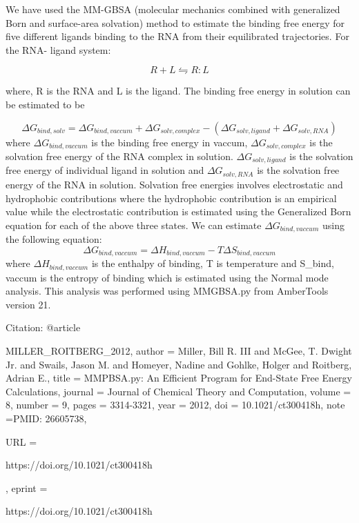 We have used the MM-GBSA (molecular mechanics combined with generalized Born and surface-area solvation) method to 
estimate the binding free energy for five different ligands binding to the RNA from their equilibrated trajectories. For the RNA-
ligand system:

\begin{equation} \label{eq:MMGBSA_reaction}
R + L \leftrightharpoons R:L
\end{equation}

where, R is the RNA and L is the ligand.
The binding free energy in solution can be estimated to be 

\begin{equation} \label{eq:MMGBSA_delG_equation}
\Delta G_{bind, solv} = \Delta G_{bind, vaccum} + \Delta G_{solv, complex} -(\Delta G_{solv, ligand} + \Delta G_{solv, RNA})
\end{equation}
where $\Delta G_{bind, vaccum} $ is the binding free energy in vaccum, $\Delta G_{solv, complex}$ is the solvation free energy of 
the RNA complex in solution.
$\Delta G_{solv, ligand}$ is the solvation free energy of individual ligand in solution and $\Delta G_{solv, RNA}$ is the solvation free energy of the RNA in solution.
Solvation free energies involves electrostatic and hydrophobic contributions where the hydrophobic contribution is an empirical value while the electrostatic contribution is estimated using the 
Generalized Born equation for each of the above three states.
We can estimate $\Delta G_{bind, vaccum} $ using the following equation:
\begin{equation} \label{}
 \Delta G_{bind, vaccum} = \Delta H_{bind, vaccum} - T \Delta S_{bind, vaccum}
\end{equation}
where $\Delta H_{bind, vaccum}$ is the enthalpy of binding, T is temperature and \Delta S_{bind, vaccum} is the entropy of binding which is estimated using the Normal mode analysis.
This analysis was performed using MMGBSA.py from AmberTools version 21.\cite{MILLER_ROITBERG_2012}

Citation:
@article{MILLER_ROITBERG_2012,
author = {Miller, Bill R. III and McGee, T. Dwight Jr. and Swails, Jason M. and Homeyer, Nadine and Gohlke, Holger and Roitberg, Adrian E.},
title = {MMPBSA.py: An Efficient Program for End-State Free Energy Calculations},
journal = {Journal of Chemical Theory and Computation},
volume = {8},
number = {9},
pages = {3314-3321},
year = {2012},
doi = {10.1021/ct300418h},
    note ={PMID: 26605738},

URL = { 
        https://doi.org/10.1021/ct300418h
    
},
eprint = { 
        https://doi.org/10.1021/ct300418h
    
}

}